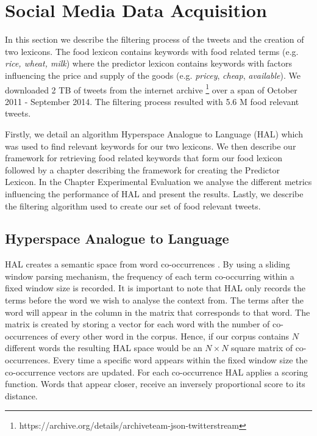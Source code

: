 \chapter{Social Media Data Acquisition}
In this section we describe the filtering process of the tweets and the creation of two lexicons. The food lexicon contains keywords with food related terms (e.g. \emph {rice, wheat, milk}) where the predictor lexicon contains keywords with factors influencing the price and supply of the goods (e.g. \emph{pricey}, \emph {cheap}, \emph{available}). We downloaded 2 TB of tweets from the internet archive \footnote{https://archive.org/details/archiveteam-json-twitterstream} over a span of October 2011 - September 2014.  The filtering process resulted with 5.6 M food relevant tweets.

Firstly, we detail an algorithm Hyperspace Analogue to Language (HAL)  \cite{lund96} which was used to find relevant keywords for our two lexicons. We then describe our framework for retrieving food related keywords that form our food lexicon followed by a chapter describing the framework for creating the Predictor Lexicon. In the Chapter Experimental Evaluation we analyse the different metrics influencing the performance of HAL and present the results. Lastly, we describe the filtering algorithm used to create our set of food relevant tweets.


\section{Hyperspace Analogue to Language}

HAL creates a semantic space from word co-occurrences \cite{lund96}. By using a sliding window parsing mechanism, the frequency of each term co-occurring within a fixed window size is recorded.  It is important to note that HAL only records the terms before the word we wish to analyse the context from. The terms after the word will appear in the column in the matrix that corresponds to that word.  The matrix is created by storing a vector for each word with the number of co-occurrences of every other word in the corpus. Hence, if our corpus contains $N$ different words the resulting HAL space would be an $N \times N$ square matrix of co-occurrences. Every time a specific word appears within the fixed window size the co-occurrence vectors are updated. For each co-occurrence HAL applies a scoring function. Words that appear closer, receive an inversely proportional score to its distance.

